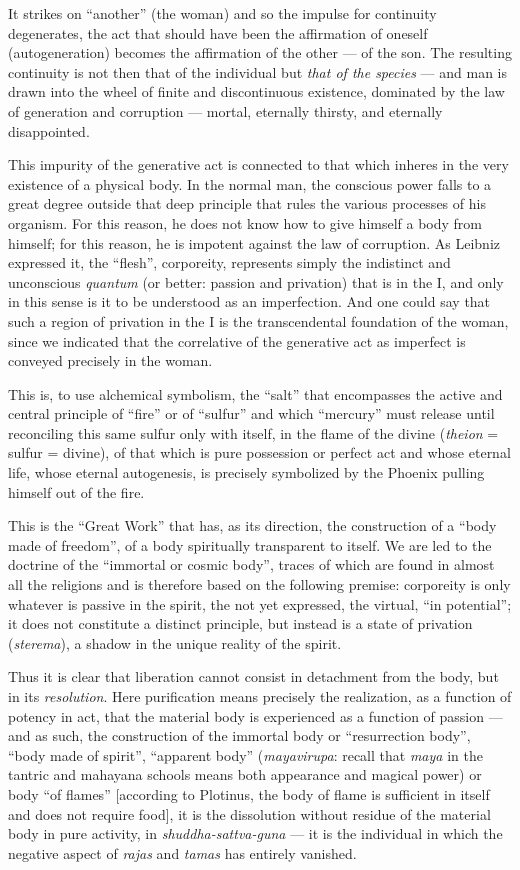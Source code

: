 It strikes on “another” (the woman) and so the impulse for continuity degenerates, the act that should have been the affirmation of oneself (autogeneration) becomes the affirmation of the other — of the son. The resulting continuity is not then that of the individual but \textit{that of the species} — and man is drawn into the wheel of finite and discontinuous existence, dominated by the law of generation and corruption — mortal, eternally thirsty, and eternally disappointed.

This impurity of the generative act is connected to that which inheres in the very existence of a physical body. In the normal man, the conscious power falls to a great degree outside that deep principle that rules the various processes of his organism. For this reason, he does not know how to give himself a body from himself; for this reason, he is impotent against the law of corruption. As Leibniz expressed it, the “flesh”, corporeity, represents simply the indistinct and unconscious \textit{quantum} (or better: passion and privation) that is in the I, and only in this sense is it to be understood as an imperfection. And one could say that such a region of privation in the I is the transcendental foundation of the woman, since we indicated that the correlative of the generative act as imperfect is conveyed precisely in the woman.

This is, to use alchemical symbolism, the “salt” that encompasses the active and central principle of “fire” or of “sulfur” and which “mercury” must release until reconciling this same sulfur only with itself, in the flame of the divine (\textit{theion} = sulfur = divine), of that which is pure possession or perfect act and whose eternal life, whose eternal autogenesis, is precisely symbolized by the Phoenix pulling himself out of the fire.

This is the “Great Work” that has, as its direction, the construction of a “body made of freedom”, of a body spiritually transparent to itself. We are led to the doctrine of the “immortal or cosmic body”, traces of which are found in almost all the religions and is therefore based on the following premise: corporeity is only whatever is passive in the spirit, the not yet expressed, the virtual, “in potential”; it does not constitute a distinct principle, but instead is a state of privation (\textit{sterema}), a shadow in the unique reality of the spirit.

Thus it is clear that liberation cannot consist in detachment from the body, but in its \textit{resolution}. Here purification means precisely the realization, as a function of potency in act, that the material body is experienced as a function of passion — and as such, the construction of the immortal body or “resurrection body”, “body made of spirit”, “apparent body” (\textit{mayavirupa}: recall that \textit{maya} in the tantric and mahayana schools means both appearance and magical power) or body “of flames” [according to Plotinus, the body of flame is sufficient in itself and does not require food], it is the dissolution without residue of the material body in pure activity, in \textit{shuddha-sattva-guna} — it is the individual in which the negative aspect of \textit{rajas} and \textit{tamas} has entirely vanished.

